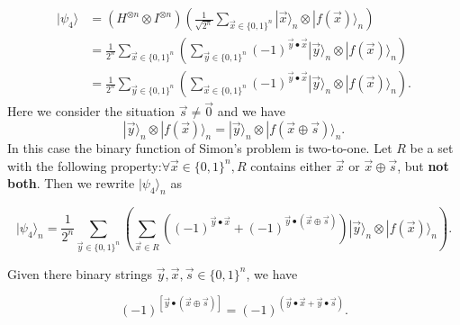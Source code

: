 \begin{equation}
\begin{aligned}
|\psi_4\rangle 
& =\left(H^{\otimes n} \otimes I^{\otimes n}\right) \left(\frac{1}{\sqrt{2^n}} \sum_{\vec{x} \in\{0,1\}^n}|\vec{x}\rangle_n \otimes |f(\vec{x})\rangle_n\right) \\
& =\frac{1}{2^n} \sum_{\vec{x} \in \{0, 1\}^n}\left(\sum_{\vec{y} \in \{0, 1\}^n}(-1)^{\vec{y} \bullet \vec{x}}|\vec{y}\rangle_n \otimes|f(\vec{x})\rangle_n\right)\\
& =\frac{1}{2^n} \sum_{\vec{y} \in \{0, 1\}^n}\left(\sum_{\vec{x} \in \{0, 1\}^n}(-1)^{\vec{y} \bullet \vec{x}}|\vec{y}\rangle_n \otimes|f(\vec{x})\rangle_n\right).
\end{aligned}
\end{equation}
Here we consider the situation $\vec{s} \neq \vec{0}$ and we have
\begin{equation}
    |\vec{y}\rangle_n \otimes|f(\vec{x})\rangle_n=|\vec{y}\rangle_n \otimes|f(\vec{x} \oplus \vec{s})\rangle_n.
\end{equation}
In this case the binary function of Simon's problem is two-to-one. Let $R$ be a set with the following property:$\forall \vec{x} \in\{0,1\}^n, R$ contains either $\vec{x}$ or $\vec{x} \oplus \vec{s}$, but \textbf{not both}. Then we rewrite $|\psi_4\rangle_n$ as

\begin{equation}
    |\psi_4\rangle_n = \frac{1}{2^{n}} \sum_{\vec{y} \in \{0,1\}^n}\left(\sum_{\vec{x} \in R} \left((-1)^{\vec{y} \bullet \vec{x}} +(-1)^{\vec{y} \bullet(\vec{x} \oplus \vec{s})}\right)|\vec{y}\rangle_n \otimes |f(\vec{x})\rangle_n\right).
\end{equation}
\begin{remark}\label{binary string 1}
Given there binary strings $\vec{y}, \vec{x}, \vec{s} \in \{0, 1\}^n$, we have

\begin{equation}
    (-1)^{[\vec{y} \bullet (\vec{x} \oplus \vec{s})]} 
= (-1)^{(\vec{y} \bullet \vec{x}+\vec{y} \bullet \vec{s})}.
\end{equation}
\end{remark}

